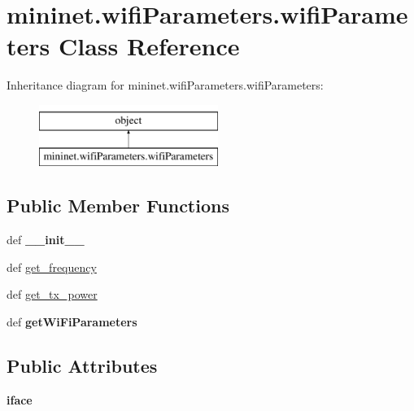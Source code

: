 \hypertarget{classmininet_1_1wifiParameters_1_1wifiParameters}{\section{mininet.\-wifi\-Parameters.\-wifi\-Parameters Class Reference}
\label{classmininet_1_1wifiParameters_1_1wifiParameters}
}
Inheritance diagram for mininet.\-wifi\-Parameters.\-wifi\-Parameters\-:\begin{figure}[H]
\begin{center}
\leavevmode
\includegraphics[height=2.000000cm]{classmininet_1_1wifiParameters_1_1wifiParameters}
\end{center}
\end{figure}
\subsection*{Public Member Functions}
\begin{DoxyCompactItemize}
\item 
\hypertarget{classmininet_1_1wifiParameters_1_1wifiParameters_a60b88ae0a47f3595d084944472668fed}{def {\bfseries \-\_\-\-\_\-init\-\_\-\-\_\-}}\label{classmininet_1_1wifiParameters_1_1wifiParameters_a60b88ae0a47f3595d084944472668fed}

\item 
def \hyperlink{classmininet_1_1wifiParameters_1_1wifiParameters_ad4317f6aa5f351e93e679cb55bdb0afc}{get\-\_\-frequency}
\item 
def \hyperlink{classmininet_1_1wifiParameters_1_1wifiParameters_a6accba128630c6880faf96187770cb5a}{get\-\_\-tx\-\_\-power}
\item 
\hypertarget{classmininet_1_1wifiParameters_1_1wifiParameters_a227c5642c73772b1050b72d4ae8298fa}{def {\bfseries get\-Wi\-Fi\-Parameters}}\label{classmininet_1_1wifiParameters_1_1wifiParameters_a227c5642c73772b1050b72d4ae8298fa}

\end{DoxyCompactItemize}
\subsection*{Public Attributes}
\begin{DoxyCompactItemize}
\item 
\hypertarget{classmininet_1_1wifiParameters_1_1wifiParameters_a1d318d6b6b70e8b4b144f07e788750ef}{{\bfseries iface}}\label{classmininet_1_1wifiParameters_1_1wifiParameters_a1d318d6b6b70e8b4b144f07e788750ef}

\end{DoxyCompactItemize}


